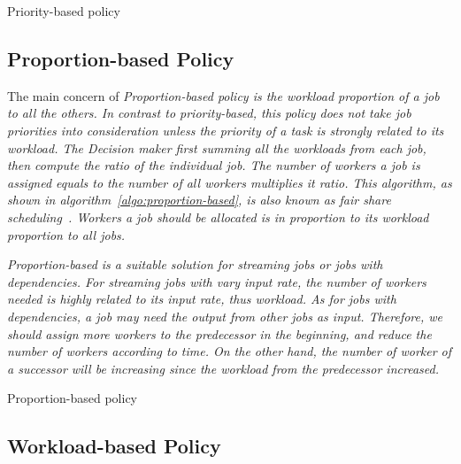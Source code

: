 \begin{algorithm}[htbp]
  
  \caption{Priority-based policy}
  \label{algo:priority-based}
\end{algorithm}

\subsection{Proportion-based Policy}	 %

The main concern of \em{Proportion-based} policy is the workload 
proportion of a job to all the others.
In contrast to \em{priority-based}, this policy does not take job 
priorities into consideration unless the priority of a task is strongly 
related to its workload.
The \em{Decision maker} first summing all the workloads from each job, 
then compute the ratio of the individual job.
The number of workers a job is assigned equals to the number of all 
workers multiplies it ratio.
This algorithm, as shown in algorithm~\ref{algo:proportion-based}, is
also known as \emph{fair share scheduling}~\cite{cite:fair-share-scheduling}.
Workers a job should be allocated is in proportion to its workload 
proportion to all jobs. 

\em{Proportion-based} is a suitable solution for streaming jobs or jobs
with dependencies.  For streaming jobs with vary input rate, the number 
of workers needed is highly related to its input rate, thus workload.
As for jobs with dependencies, a job may need the output from other 
jobs as input.
Therefore, we should assign more workers to the predecessor in the 
beginning, and reduce the number of workers according to time.
On the other hand, the number of worker of a successor will be 
increasing since the workload from the predecessor increased.


\begin{algorithm}[htbp]
  
  \caption{Proportion-based policy}
  \label{algo:proportion-based}
\end{algorithm}


\subsection{Workload-based Policy}       %

